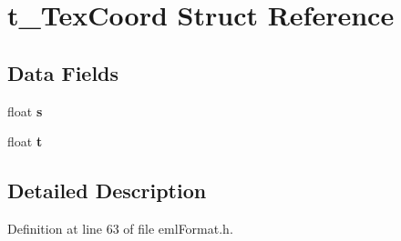 \hypertarget{structt___tex_coord}{}\section{t\+\_\+\+Tex\+Coord Struct Reference}
\label{structt___tex_coord}
\subsection*{Data Fields}
\begin{DoxyCompactItemize}
\item 
float {\bfseries s}\hypertarget{structt___tex_coord_af9d8994d44ddaced577c0c34ca219739}{}\label{structt___tex_coord_af9d8994d44ddaced577c0c34ca219739}

\item 
float {\bfseries t}\hypertarget{structt___tex_coord_ac5b02aef63fcb5a0014a7edde9b80067}{}\label{structt___tex_coord_ac5b02aef63fcb5a0014a7edde9b80067}

\end{DoxyCompactItemize}


\subsection{Detailed Description}


Definition at line 63 of file eml\+Format.\+h.

